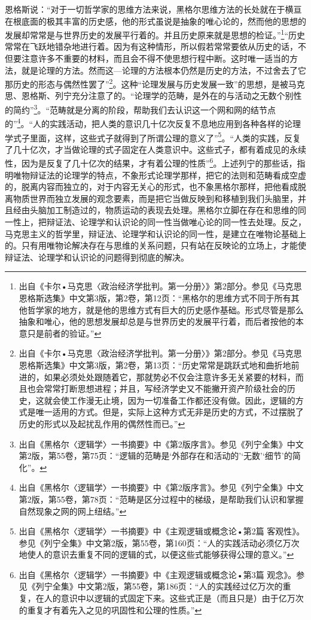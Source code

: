 \documentclass[UTF8, 12pt, a4paper]{ctexrep}
\begin{document}
恩格斯说：“对于一切哲学家的思维方法来说，黑格尔思维方法的长处就在于横亘在根底面的极其丰富的历史感，他的形式虽说是抽象的唯心论的，然而他的思想的发展却常常是与世界历史的发展平行着的。并且历史原来就是思想的检证。”\footnote{出自《卡尔•马克思〈政治经济学批判。第一分册〉》第2部分。参见《马克思恩格斯选集》中文第3版，第2卷，第12页：“黑格尔的思维方式不同于所有其他哲学家的地方，就是他的思维方式有巨大的历史感作基础。形式尽管是那么抽象和唯心，他的思想发展却总是与世界历史的发展平行着，而后者按他的本意只是前者的验证。”}“历史常常在飞跃地错杂地进行着。因为有这种情形，所以假若常常要依从历史的话，不但要注意许多不重要的材料，而且会不得不使思想行程中断。这时唯一适当的方法，就是论理的方法。然而这—论理的方法根本仍然是历史的方法，不过舍去了它那历史的形态与偶然性罢了”\footnote{出自《卡尔•马克思〈政治经济学批判。第一分册〉》第2部分。参见《马克思恩格斯选集》中文第3版，第2卷，第13页：“历史常常是跳跃式地和曲折地前进的，如果必须处处跟随着它，那就势必不仅会注意许多无关紧要的材料，而且也会常常打断思想进程；并且，写经济学史又不能撇开资产阶级社会的历史，这就会使工作漫无止境，因为一切准备工作都还没有做。因此，逻辑的方式是唯一适用的方式。但是，实际上这种方式无非是历史的方式，不过摆脱了历史的形式以及起扰乱作用的偶然性而已。”}。这种“论理发展与历史发展一致”的思想，是被马克思、恩格斯、列宁充分注意了的。“论理学的范畴，是外在的与活动之无数个别性的简约”\footnote{出自《黑格尔〈逻辑学〉一书摘要》中《第2版序言》。参见《列宁全集》中文第2版，第55卷，第75页：“逻辑的范畴是‘外部存在和活动的’‘无数’‘细节’的简化”。}。“范畴就是分离的阶段，帮助我们去认识这一个网和网的结节点的”\footnote{出自《黑格尔〈逻辑学〉一书摘要》中《第2版序言》。参见《列宁全集》中文第2版，第55卷，第78页：“范畴是区分过程中的梯级，是帮助我们认识和掌握自然现象之网的网上纽结。”}。“人的实践活动，把人类的意识几十亿次反复不息地应用到各种各样的论理学式子里面，这样，这些式子就得到了所谓公理的意义了”\footnote{出自《黑格尔〈逻辑学〉一书摘要》中《主观逻辑或概念论•第2篇 客观性》。参见《列宁全集》中文第2版，第55卷，第160页：“人的实践活动必须亿万次地使人的意识去重复不同的逻辑的式，以便这些式能够获得公理的意义。”}。“人类的实践，反复了几十亿次，才当做论理的式子固定在人类意识中。这些式子，都有着成见的永续性，因为是反复了几十亿次的结果，才有着公理的性质”\footnote{出自《黑格尔〈逻辑学〉一书摘要》中《主观逻辑或概念论•第3篇 观念》。参见《列宁全集》中文第2版，第55卷，第186页：“人的实践经过亿万次的重复，在人的意识中以逻辑的式固定下来。这些式正是（而且只是）由于亿万次的重复才有着先入之见的巩固性和公理的性质。”}。上述列宁的那些话，指明唯物辩证法的论理学的特点，不象形式论理学那样，把它的法则和范畴看成空虚的，脱离内容而独立的，对于内容无关心的形式，也不象黑格尔那样，把他看成脱离物质世界而独立发展的观念要素，而是把它当做反映到和移植到我们头脑里，并且经由头脑加工制造过的，物质运动的表现去处理。黑格尔立脚在存在和思维的同一性上，把辩证法、论理学和认识论的同一性当做唯心论的同一性去处理。反之，马克思主义的哲学里，辩证法、论理学和认识论的同一性，是建立在唯物论基础上的。只有用唯物论解决存在与思维的关系问题，只有站在反映论的立场上，才能使辩证法、论理学和认识论的问题得到彻底的解决。
\end{document}
